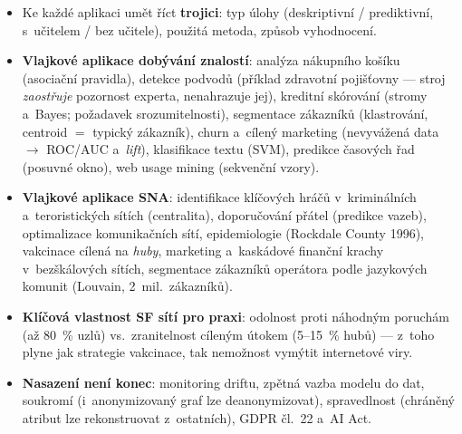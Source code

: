 \documentclass[11pt,a4paper]{article}
\theoremstyle{definition}
\begin{document}
\begin{itemize}
\item Ke každé aplikaci umět říct \textbf{trojici}: typ úlohy (deskriptivní / prediktivní,
      s~učitelem / bez učitele), použitá metoda, způsob vyhodnocení.
\item \textbf{Vlajkové aplikace dobývání znalostí}: analýza nákupního košíku (asociační
      pravidla), detekce podvodů (příklad zdravotní pojišťovny --- stroj \emph{zaostřuje}
      pozornost experta, nenahrazuje jej), kreditní skórování (stromy a~Bayes; požadavek
      srozumitelnosti), segmentace zákazníků (klastrování, centroid $=$ typický zákazník),
      churn a~cílený marketing (nevyvážená data $\to$ ROC/AUC a~\emph{lift}), klasifikace textu
      (SVM), predikce časových řad (posuvné okno), web usage mining (sekvenční vzory).
\item \textbf{Vlajkové aplikace SNA}: identifikace klíčových hráčů v~kriminálních
      a~teroristických sítích (centralita), doporučování přátel (predikce vazeb), optimalizace
      komunikačních sítí, epidemiologie (Rockdale County 1996), vakcinace cílená na \emph{huby},
      marketing a~kaskádové finanční krachy v~bezškálových sítích, segmentace zákazníků
      operátora podle jazykových komunit (Louvain, 2~mil.\ zákazníků).
\item \textbf{Klíčová vlastnost SF sítí pro praxi}: odolnost proti náhodným poruchám (až 80~\%
      uzlů) vs.\ zranitelnost cíleným útokem (5--15~\% hubů) --- z~toho plyne jak strategie
      vakcinace, tak nemožnost vymýtit internetové viry.
\item \textbf{Nasazení není konec}: monitoring driftu, zpětná vazba modelu do dat, soukromí
      (i~anonymizovaný graf lze deanonymizovat), spravedlnost (chráněný atribut lze
      rekonstruovat z~ostatních), GDPR čl.~22 a~AI Act.
\end{itemize}
\end{document}
